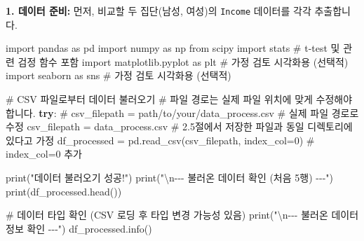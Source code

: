 \documentclass[
  letterpaper,
]{book}
\newenvironment{Shaded}{\begin{snugshade}}{\end{snugshade}}
\newcommand{\BuiltInTok}[1]{\textcolor[rgb]{0.00,0.23,0.31}{#1}}
\newcommand{\CharTok}[1]{\textcolor[rgb]{0.13,0.47,0.30}{#1}}
\newcommand{\CommentTok}[1]{\textcolor[rgb]{0.37,0.37,0.37}{#1}}
\newcommand{\ControlFlowTok}[1]{\textcolor[rgb]{0.00,0.23,0.31}{\textbf{#1}}}
\newcommand{\DecValTok}[1]{\textcolor[rgb]{0.68,0.00,0.00}{#1}}
\newcommand{\ImportTok}[1]{\textcolor[rgb]{0.00,0.46,0.62}{#1}}
\newcommand{\NormalTok}[1]{\textcolor[rgb]{0.00,0.23,0.31}{#1}}
\newcommand{\OperatorTok}[1]{\textcolor[rgb]{0.37,0.37,0.37}{#1}}
\newcommand{\StringTok}[1]{\textcolor[rgb]{0.13,0.47,0.30}{#1}}
\begin{document}
\textbf{1. 데이터 준비:} 먼저, 비교할 두 집단(남성, 여성)의
\texttt{Income} 데이터를 각각 추출합니다.

\begin{Shaded}
\begin{Highlighting}[]
\ImportTok{import}\NormalTok{ pandas }\ImportTok{as}\NormalTok{ pd}
\ImportTok{import}\NormalTok{ numpy }\ImportTok{as}\NormalTok{ np}
\ImportTok{from}\NormalTok{ scipy }\ImportTok{import}\NormalTok{ stats }\CommentTok{\# t{-}test 및 관련 검정 함수 포함}
\ImportTok{import}\NormalTok{ matplotlib.pyplot }\ImportTok{as}\NormalTok{ plt }\CommentTok{\# 가정 검토 시각화용 (선택적)}
\ImportTok{import}\NormalTok{ seaborn }\ImportTok{as}\NormalTok{ sns }\CommentTok{\# 가정 검토 시각화용 (선택적)}

\CommentTok{\# CSV 파일로부터 데이터 불러오기}
\CommentTok{\# 파일 경로는 실제 파일 위치에 맞게 수정해야 합니다.}
\ControlFlowTok{try}\NormalTok{:}
    \CommentTok{\# csv\_filepath = \textquotesingle{}path/to/your/data\_process.csv\textquotesingle{} \# 실제 파일 경로로 수정}
\NormalTok{    csv\_filepath }\OperatorTok{=} \StringTok{\textquotesingle{}data\_process.csv\textquotesingle{}} \CommentTok{\# 2.5절에서 저장한 파일과 동일 디렉토리에 있다고 가정}
\NormalTok{    df\_processed }\OperatorTok{=}\NormalTok{ pd.read\_csv(csv\_filepath, index\_col}\OperatorTok{=}\DecValTok{0}\NormalTok{) }\CommentTok{\# index\_col=0 추가}

    \BuiltInTok{print}\NormalTok{(}\StringTok{"데이터 불러오기 성공!"}\NormalTok{)}
    \BuiltInTok{print}\NormalTok{(}\StringTok{"}\CharTok{\textbackslash{}n}\StringTok{{-}{-}{-} 불러온 데이터 확인 (처음 5행) {-}{-}{-}"}\NormalTok{)}
    \BuiltInTok{print}\NormalTok{(df\_processed.head())}

    \CommentTok{\# 데이터 타입 확인 (CSV 로딩 후 타입 변경 가능성 있음)}
    \BuiltInTok{print}\NormalTok{(}\StringTok{"}\CharTok{\textbackslash{}n}\StringTok{{-}{-}{-} 불러온 데이터 정보 확인 {-}{-}{-}"}\NormalTok{)}
\NormalTok{    df\_processed.info()}


\end{Highlighting}
\end{Shaded}
\end{document}
